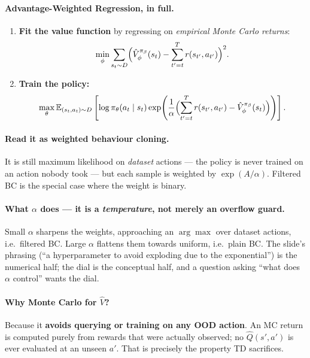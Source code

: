 \documentclass[11pt,a4paper]{article}
\begin{document}
\paragraph{Advantage-Weighted Regression, in full.}
\begin{enumerate}[label=\arabic*.]
\item \textbf{Fit the value function} by regressing on \emph{empirical Monte
Carlo returns}:
\[
\min_\phi\sum_{s_t\sim D}\Bigl(\hat V^{\pi_\beta}_\phi(s_t)-\sum_{t'=t}^{T} r(s_{t'},a_{t'})\Bigr)^2 .
\]
\item \textbf{Train the policy:}
\[
\max_\theta \mathbb E_{(s_t,a_t)\sim D}\left[\log\pi_\theta(a_t\mid s_t)
\exp\!\left(\frac{1}{\alpha}\Bigl(\sum_{t'=t}^{T} r(s_{t'},a_{t'})-\hat V^{\pi_\beta}_\phi(s_t)\Bigr)\right)\right].
\]
\end{enumerate}

\paragraph{Read it as weighted behaviour cloning.} It is still maximum
likelihood on \emph{dataset} actions --- the policy is never trained on an
action nobody took --- but each sample is weighted by $\exp(A/\alpha)$.
Filtered BC is the special case where the weight is binary.

\paragraph{What $\alpha$ does --- it is a \emph{temperature}, not merely an
overflow guard.} Small $\alpha$ sharpens the weights, approaching an
$\arg\max$ over dataset actions, i.e.\ filtered BC. Large $\alpha$ flattens
them towards uniform, i.e.\ plain BC. The slide's phrasing (``a
hyperparameter to avoid exploding due to the exponential'') is the numerical
half; the dial is the conceptual half, and a question asking ``what does
$\alpha$ control'' wants the dial.

\paragraph{Why Monte Carlo for $\hat V$?} Because it \textbf{avoids querying
or training on any OOD action}. An MC return is computed purely from rewards
that were actually observed; no $\hat Q(s',a')$ is ever evaluated at an unseen
$a'$. That is precisely the property TD sacrifices.
\end{document}
